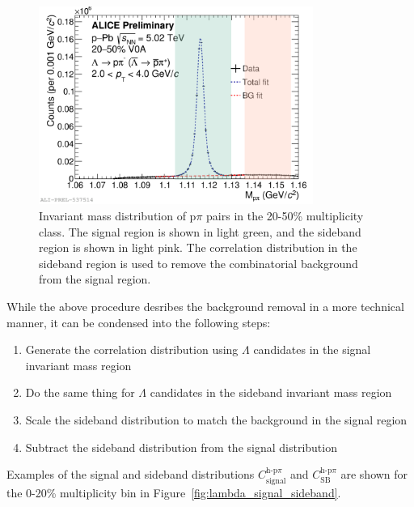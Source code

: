 \begin{figure}[ht]
	\centering
	\includegraphics[width=0.8\textwidth]{figures/analysis/lambda_mass_regions.png}
	\caption{Invariant mass distribution of p$\pi$ pairs in the 20-50\% multiplicity class. The signal region is shown in light green, and the sideband region is shown in light pink. The correlation distribution in the sideband region is used to remove the combinatorial background from the signal region.}
	\label{fig:signal_sideband_regions}
\end{figure}

While the above procedure desribes the background removal in a more technical manner, it can be condensed into the following steps:
%
\begin{enumerate}
	\item Generate the correlation distribution using $\Lambda$ candidates in the signal invariant mass region
	\item Do the same thing for $\Lambda$ candidates in the sideband invariant mass region
	\item Scale the sideband distribution to match the background in the signal region
	\item Subtract the sideband distribution from the signal distribution
\end{enumerate}
%
Examples of the signal and sideband distributions $C_{\text{signal}}^{\text{h-p}\pi}$ and $C_{\text{SB}}^{\text{h-p}\pi}$ are shown for the 0-20\% multiplicity bin in Figure~\ref{fig:lambda_signal_sideband}.

